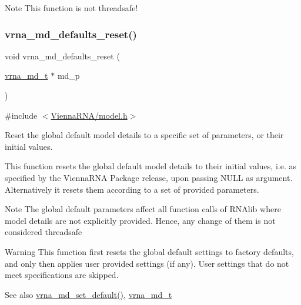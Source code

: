 \begin{DoxyNote}{Note}
This function is not threadsafe! 
\end{DoxyNote}
\mbox{\label{group__model__details_ga70834424cf804d149937de89f80ceb45}} 
\subsubsection{\texorpdfstring{vrna\+\_\+md\+\_\+defaults\+\_\+reset()}{vrna\_md\_defaults\_reset()}}
{\footnotesize\ttfamily void vrna\+\_\+md\+\_\+defaults\+\_\+reset (\begin{DoxyParamCaption}\item[{\hyperlink{group__model__details_ga1f8a10e12a0a1915f2a4eff0b28ea17c}{vrna\+\_\+md\+\_\+t} $\ast$}]{md\+\_\+p }\end{DoxyParamCaption})}



{\ttfamily \#include $<$\hyperlink{model_8h}{Vienna\+R\+N\+A/model.\+h}$>$}



Reset the global default model details to a specific set of parameters, or their initial values. 

This function resets the global default model details to their initial values, i.\+e. as specified by the Vienna\+R\+NA Package release, upon passing N\+U\+LL as argument. Alternatively it resets them according to a set of provided parameters.

\begin{DoxyNote}{Note}
The global default parameters affect all function calls of R\+N\+Alib where model details are not explicitly provided. Hence, any change of them is not considered threadsafe 
\end{DoxyNote}
\begin{DoxyWarning}{Warning}
This function first resets the global default settings to factory defaults, and only then applies user provided settings (if any). User settings that do not meet specifications are skipped. 
\end{DoxyWarning}
\begin{DoxySeeAlso}{See also}
\hyperlink{group__model__details_ga8ac6ff84936282436f822644bf841f66}{vrna\+\_\+md\+\_\+set\+\_\+default()}, \hyperlink{group__model__details_ga1f8a10e12a0a1915f2a4eff0b28ea17c}{vrna\+\_\+md\+\_\+t}
\end{DoxySeeAlso}

